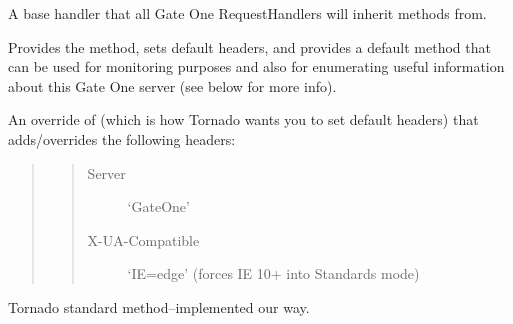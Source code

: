 \documentclass[letterpaper,10pt,openany]{sphinxmanual}
\begin{document}
\begin{fulllineitems}
\label{Developer/server:gateone.core.server.BaseHandler}
A base handler that all Gate One RequestHandlers will inherit methods from.

Provides the {\hyperref[Developer/server:gateone.core.server.BaseHandler.get_current_user]{}} method, sets default headers, and
provides a default {\hyperref[Developer/server:gateone.core.server.BaseHandler.options]{}} method that can be used for monitoring
purposes and also for enumerating useful information about this Gate One
server (see below for more info).

\begin{fulllineitems}
\label{Developer/server:gateone.core.server.BaseHandler.set_default_headers}
An override of 
(which is how Tornado wants you to set default headers) that
adds/overrides the following headers:
\begin{quote}
\begin{quote}\begin{description}
\item[{Server}] \leavevmode
`GateOne'

\item[{X-UA-Compatible}] \leavevmode
`IE=edge' (forces IE 10+ into Standards mode)

\end{description}\end{quote}
\end{quote}

\end{fulllineitems}


\begin{fulllineitems}
\label{Developer/server:gateone.core.server.BaseHandler.get_current_user}
Tornado standard method--implemented our way.

\end{fulllineitems}



\end{fulllineitems}
\end{document}
